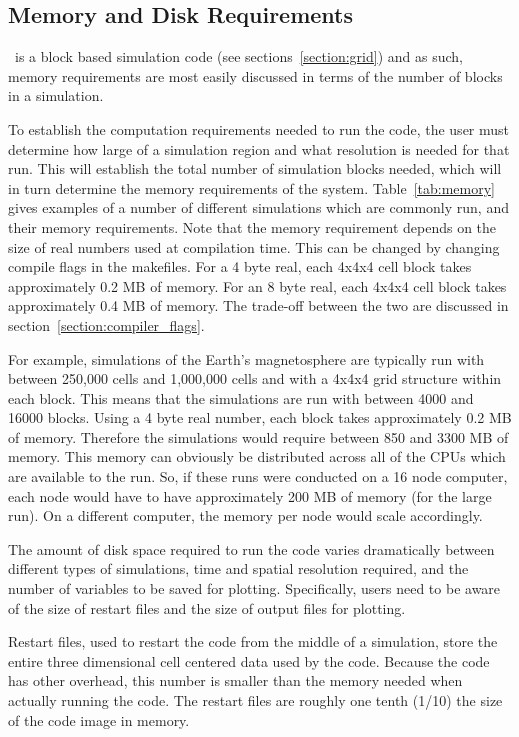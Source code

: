 \subsection{Memory and Disk Requirements \label{section:memory}}

\BATSRUS\ is a block based simulation code (see sections~\ref{section:grid})
 and as
such, memory requirements are most easily discussed in terms of the number
of blocks in a simulation.

To establish the computation requirements needed to run the code, the
user must determine how large of a simulation region 
and what resolution is needed for that run.  This will
establish the total number of simulation blocks needed,
which will in turn determine the memory requirements of the system.
Table~\ref{tab:memory} gives examples of a number of different simulations
which are commonly run, and their memory requirements.  
Note that the memory requirement depends on the size of real numbers 
used at compilation time. This can be changed by changing compile flags
in the makefiles.  For a 4 byte real, each 4x4x4 cell block takes 
approximately 0.2 MB of memory.  For an 8 byte real, each 4x4x4 cell block takes
approximately 0.4 MB of memory.  The trade-off between the two are discussed
in section~\ref{section:compiler_flags}.

For example, simulations of the Earth's magnetosphere are typically
run with between 250,000 cells and 1,000,000 cells and with a 4x4x4 
grid structure within each block.  This means that the simulations 
are run with between 4000 and
16000 blocks.  Using a 4 byte real number, each block takes approximately 
0.2 MB of memory.
Therefore the simulations would require between 850 and 3300 MB of
memory.  This memory can obviously be distributed across all of the
CPUs which are available to the run.  So, if these runs were conducted
on a 16 node computer, each node would have to have approximately 200
MB of memory (for the large run).  On a different computer, the memory
per node would scale accordingly.

The amount of disk space required to run the code varies dramatically
between different types of simulations, time and spatial resolution
required, and the number of variables to be saved for plotting.  
Specifically, users need to be aware of the size of restart files and
the size of output files for plotting.

Restart files, used to restart the code from the middle of a simulation,
store the entire three dimensional cell centered data used by the code.
Because the code has other overhead, this number is smaller than the memory
needed when actually running the code.  The restart files are roughly
one tenth (1/10) the size of the code image in memory.

